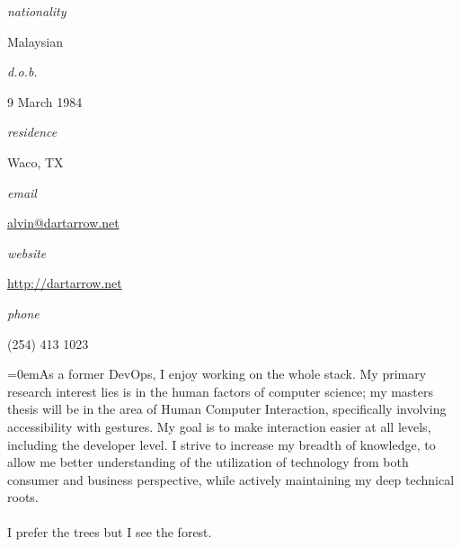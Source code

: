 \documentclass{scrartcl}
\newcommand{\MarginText}[1]{\marginpar{\raggedleft\small#1}} %
\newcommand{\Columize}[2]{\noindent \parbox{2cm}{\textsl{#1}} {#2} } %
\newcommand{\Description}[1]{\hangindent=0em\hangafter=0\noindent\footnotesize{#1}\par\normalsize\vspace{1em}} %
\newcommand{\Redvline}[0]{\vspace{0.5em}\noindent{\color{ThemeColor}\rule{11.8cm}{0.4pt}}}
\newcommand{\MyName}[1]{\noindent{\textsc{\LARGE{\color{ThemeColor}#1}}}} %
\newcommand{\BlockTitle}[1]{\MarginText{\vspace{2.15em}}\noindent{\spacedlowsmallcaps{#1}}\vspace{1em}}
\begin{document}
\thispagestyle{empty} %


\MyName{Alvin Jude} %

\vspace{-0.3em}

\Redvline

\begin{multicols}{2}\vspace{0.5em}
\Columize{nationality}{Malaysian} %

\Columize{d.o.b.}{9 March 1984} %

\Columize{residence}{Waco, TX} %

\columnbreak

\Columize{email}{\href{mailto:alvin@dartarrow.net}{alvin@dartarrow.net}} %

\Columize{website}{\href{http://dartarrow.net}{http://dartarrow.net}} %

\Columize{phone}{(254) 413 1023 } %

\end{multicols}

\vspace{1em} %

\BlockTitle{About} %

\Description{As a former DevOps, I enjoy working on the whole stack. My primary research interest lies is in the human factors of computer science; my masters thesis will be in the area of Human Computer Interaction, specifically involving accessibility with gestures. My goal is to make interaction easier at all levels, including the developer level. I strive to increase my breadth of knowledge, to allow me better understanding of the utilization of technology from both consumer and business perspective, while actively maintaining my deep technical roots.
\\
\\
I prefer the trees but I see the forest.} 

\Redvline
\end{document}
